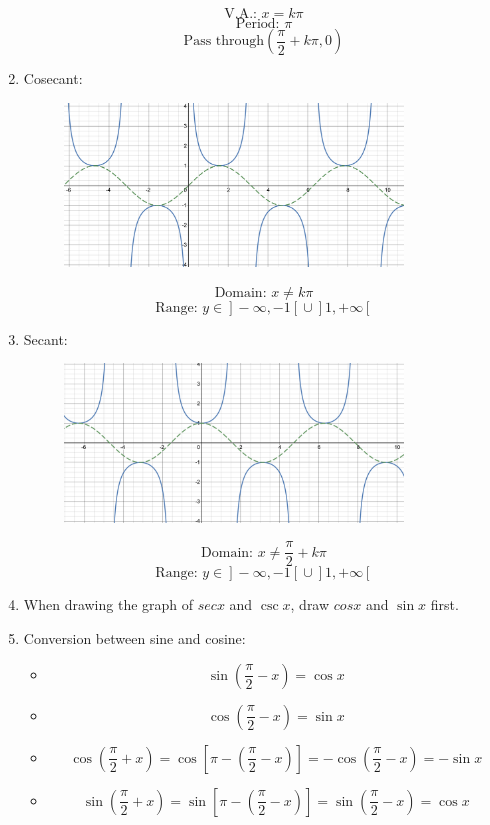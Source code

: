 \documentclass[12pt, a4paper]{article}
\begin{document}
\begin{enumerate}
\begin{figure}[H]
  \end{figure}
  $$\text{V.A.: }x=k\pi$$
  $$\text{Period: }\pi$$
  $$\text{Pass through}\left(\frac{\pi}{2}+k\pi, 0\right)$$
  \item Cosecant: 
  \begin{figure}[H]
    \centering
    \includegraphics[width=0.85\textwidth]{Fig.3.29.jpg}
  \end{figure}
  $$\text{Domain: }x\neq k\pi$$
  $$\text{Range: }y\in\left.\right]-\infty,-1\left[\right.\cup\left.\right]1,+\infty\left[\right.$$
  \item Secant: 
  \begin{figure}[H]
    \centering
    \includegraphics[width=0.85\textwidth]{Fig.3.30.jpg}
  \end{figure}
  $$\text{Domain: }x\neq\frac{\pi}{2}+k\pi$$
  $$\text{Range: }y\in\left.\right]-\infty,-1\left[\right.\cup\left.\right]1,+\infty\left[\right.$$
  \item When drawing the graph of $sec{x}$ and $\csc{x}$, draw $cos{x}$ and $\sin{x}$ first. 
  \item Conversion between sine and cosine: 
  \begin{itemize}
    \item $$\sin{\left(\frac{\pi}{2}-x\right)}=\cos{x}$$
    \item $$\cos{\left(\frac{\pi}{2}-x\right)}=\sin{x}$$
    \item $$\cos{\left(\frac{\pi}{2}+x\right)}=\cos\left[\pi-\left(\frac{\pi}{2}-x\right)\right]=-\cos{\left(\frac{\pi}{2}-x\right)}=-\sin{x}$$
    \item $$\sin{\left(\frac{\pi}{2}+x\right)}=\sin\left[\pi-\left(\frac{\pi}{2}-x\right)\right]=\sin{\left(\frac{\pi}{2}-x\right)}=\cos{x}$$
  \end{itemize}
\end{enumerate}
\end{document}
